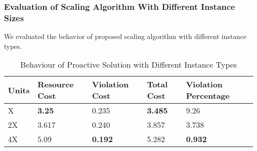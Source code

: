 \subsubsection{Evaluation of Scaling Algorithm With Different Instance Sizes}
We evaluated the behavior of proposed scaling algorithm with different instance types.  
\begin{table}
\label{dif_instance}
\caption{Behaviour of Proactive Solution with Different Instance Types}
\centering
\begin{tabular}{|l|l|l|l|l|}
\hline
Units
& Resource Cost
& Violation Cost
& Total Cost
& Violation Percentage
\\ \hline
X
&\textbf{3.25} 
&0.235
&\textbf{3.485}
&9.26
\\ \hline
2X
&3.617
&0.240
&3.857
&3.738
\\ \hline
4X
&5.09
&\textbf{0.192}
&5.282
&\textbf{0.932}
\\ \hline
\end{tabular}
\end{table}